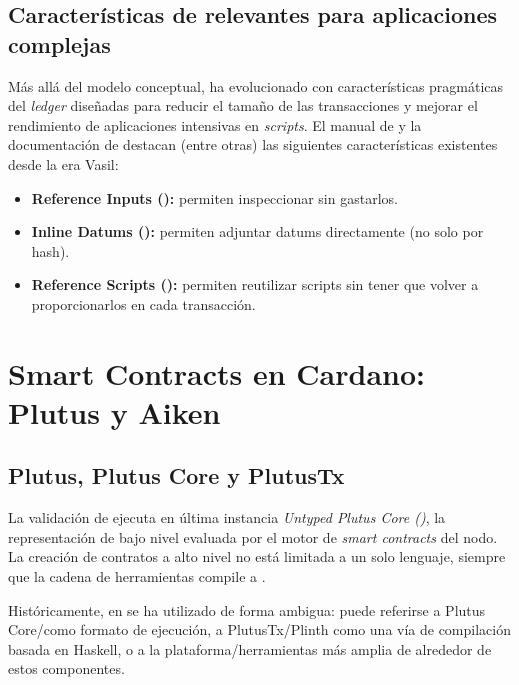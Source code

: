\subsection{Características de \eUTxO relevantes para aplicaciones complejas}
\label{subsec:motivation-caracteristicas-de-eutxo-relevantes-para-aplicaciones-complejas}

Más allá del modelo conceptual, \Cardano ha evolucionado con características pragmáticas del \textit{ledger} diseñadas para reducir el tamaño de las transacciones y mejorar el rendimiento de aplicaciones intensivas en \textit{scripts}. El manual de \eUTxO \cite{eutxo_handbook_2022} y la documentación de \Cardano destacan (entre otras) las siguientes características existentes desde la era Vasil:

\begin{itemize}[noitemsep]
	\item \textbf{Reference Inputs ():} permiten inspeccionar \UTxOs sin gastarlos.
	\item \textbf{Inline Datums ():} permiten adjuntar datums directamente (no solo por hash).
	\item \textbf{Reference Scripts ():} permiten reutilizar scripts sin tener que volver a proporcionarlos en cada transacción.
\end{itemize}

\section{Smart Contracts en Cardano: Plutus y Aiken}
\label{sec:motivation-smart-contracts-en-cardano-plutus-y-aiken}
\subsection{Plutus, Plutus Core y PlutusTx}
\label{subsec:motivation-plutus-plutus-core-y-plutustx}

La validación \Onchain de \Cardano ejecuta en última instancia \emph{Untyped Plutus Core (\UPLC)}, la representación de bajo nivel evaluada por el motor de \textit{smart contracts} del nodo. La creación de contratos a alto nivel no está limitada a un solo lenguaje, siempre que la cadena de herramientas compile a \UPLC.

Históricamente, \Plutus en \Cardano se ha utilizado de forma ambigua: puede referirse a Plutus Core/\UPLC como formato de ejecución, a PlutusTx/Plinth como una vía de compilación basada en Haskell, o a la plataforma/herramientas más amplia de \Plutus alrededor de estos componentes.

